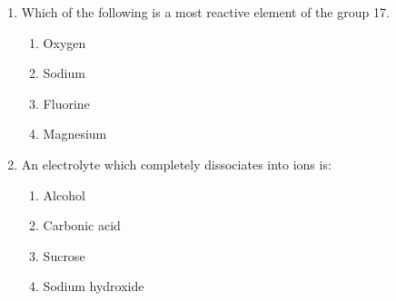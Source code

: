 \begin{enumerate}[label=(\roman*)]
    \item Which of the following is a most reactive element of the group 17.

        \begin{multicols}{2}
        \begin{enumerate}[label=(\alph*)]
            \setlength\itemsep{0em}
            \item Oxygen
            \item Sodium
            \item Fluorine
            \item Magnesium
        \end{enumerate}
        \end{multicols}

    \item An electrolyte which completely dissociates into ions is:

        \begin{multicols}{2}
        \begin{enumerate}[label=(\alph*)]
            \setlength\itemsep{0em}
            \item Alcohol
            \item Carbonic acid
            \item Sucrose
            \item Sodium hydroxide
        \end{enumerate}
        \end{multicols}

\end{enumerate}

